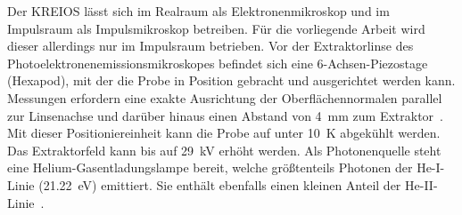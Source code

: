         Der KREIOS lässt sich im Realraum als Elektronenmikroskop und im Impulsraum als Impulsmikroskop betreiben.
        Für die vorliegende Arbeit wird dieser allerdings nur im Impulsraum betrieben.
        Vor der Extraktorlinse des Photoelektronenemissionsmikroskopes befindet sich eine 6-Achsen-Piezostage (Hexapod), mit der die Probe in Position gebracht und ausgerichtet werden kann.
        Messungen erfordern eine exakte Ausrichtung der Oberflächennormalen parallel zur Linsenachse und darüber hinaus einen Abstand von \SI{4}{\milli\meter} zum Extraktor~\cite{SPECS-MM}.
        Mit dieser Positioniereinheit kann die Probe auf unter \SI{10}{\kelvin} abgekühlt werden.
        Das Extraktorfeld kann bis auf \SI{29}{\kilo\volt} erhöht werden.
        Als Photonenquelle steht eine Helium-Gasentladungslampe bereit, welche größtenteils Photonen der He-I-Linie (\SI{21.22}{\electronvolt}) emittiert.
        Sie enthält ebenfalls einen kleinen Anteil der He-II-Linie~\cite{UVS}.
